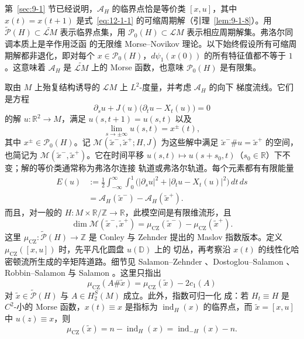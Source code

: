 第~\ref{sec:9-1} 节已经说明，$\mathcal A_H$ 的临界点恰是等价类 $[x,u]$，其中
$x(t)=x(t+1)$ 是式~\eqref{eq:12-1-1} 的可缩周期解（引理~\ref{lem:9-1-8}）。用
$\widetilde{\mathcal P}(H)\subset\widetilde{\mathcal L M}$ 表示临界点集，用
$\mathcal P_0(H)\subset\mathcal L M$ 表示相应周期解集。弗洛尔同调本质上是辛作用泛函
的无限维 Morse--Novikov 理论。以下始终假设所有可缩周期解都非退化，即对每个
$x\in\mathcal P_0(H)$，$d\psi_1(x(0))$ 的所有特征值都不等于 $1$。这意味着
$\mathcal A_H$ 是 $\widetilde{\mathcal L M}$ 上的 Morse 函数，也意味
$\mathcal P_0(H)$ 是有限集。

取由 $M$ 上殆复结构诱导的 $\mathcal L M$ 上 $L^2$-度量，并考虑 $\mathcal A_H$ 的向下
梯度流线。它们是方程
\begin{equation}\label{eq:12-1-3}
  \partial_su+J(u)\bigl(\partial_tu-X_t(u)\bigr)=0
\end{equation}
的解 $u:\mathbb R^2\to M$，满足 $u(s,t+1)=u(s,t)$ 以及
\begin{equation}\label{eq:12-1-4}
  \lim_{s\to\pm\infty}u(s,t)=x^\pm(t),
\end{equation}
其中 $x^\pm\in\mathcal P_0(H)$。记
$\mathcal M(\widetilde x^-,\widetilde x^+;H,J)$ 为这些解中满足
$\widetilde x^-\#u=\widetilde x^+$ 的空间，也简记为
$\mathcal M(\widetilde x^-,\widetilde x^+)$。它在时间平移
$u(s,t)\mapsto u(s+s_0,t)$（$s_0\in\mathbb R$）下不变；解的等价类通常称为弗洛尔连接
轨道或弗洛尔轨道。每个元素都有有限能量
\begin{equation}\label{eq:12-1-5}
\begin{aligned}
  E(u)&:=\frac12\int_{-\infty}^{\infty}\int_0^1
  \bigl(|\partial_su|^2+|\partial_tu-X_t(u)|^2\bigr)\,dt\,ds\\
  &=\mathcal A_H(\widetilde x^-)-\mathcal A_H(\widetilde x^+).
\end{aligned}
\end{equation}
而且，对一般的 $H:M\times\mathbb R/\mathbb Z\to\mathbb R$，此模空间是有限维流形，且
\[
  \dim\mathcal M(\widetilde x^-,\widetilde x^+)
  =\mu_{\mathrm{CZ}}(\widetilde x^-)-\mu_{\mathrm{CZ}}(\widetilde x^+).
\]
这里 $\mu_{\mathrm{CZ}}:\widetilde{\mathcal P}(H)\to\mathbb Z$ 是 Conley 与 Zehnder 提出的
Maslov 指数版本。定义 $\mu_{\mathrm{CZ}}([x,u])$ 时，先平凡化圆盘 $u(\mathbb D)$ 上的
切丛，再考察沿 $x(t)$ 的线性化哈密顿流所生成的辛矩阵道路。细节见
Salamon--Zehnder 、Dostoglou--Salamon 、
Robbin--Salamon  与 Salamon 。这里只指出
\begin{equation}\label{eq:12-1-6}
  \mu_{\mathrm{CZ}}(A\#\widetilde x)=\mu_{\mathrm{CZ}}(\widetilde x)-2c_1(A)
\end{equation}
对 $\widetilde x\in\widetilde{\mathcal P}(H)$ 与 $A\in H_2^S(M)$ 成立。此外，指数可归一化
成：若 $H_t\equiv H$ 是 $C^2$-小的 Morse 函数，$x(t)\equiv x$ 是指标为
$\operatorname{ind}_H(x)$ 的临界点，而 $\widetilde x=[x,u]$ 中 $u(z)\equiv x$，则
\begin{equation}\label{eq:12-1-7}
  \mu_{\mathrm{CZ}}(\widetilde x)=n-\operatorname{ind}_H(x)
  =\operatorname{ind}_{-H}(x)-n.
\end{equation}

